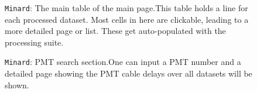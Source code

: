 \documentclass[12pt]{article}
\begin{document}
\clearpage

\begin{figure}
\centering
\noindent{}
  \caption{\centering \texttt{Minard}: The main table of the main page.\hspace{\textwidth}This table holds a line for each processed dataset. Most cells in here are clickable, leading to a more detailed page or list. These get auto-populated with the processing suite.}
  \label{fig:min2}
\end{figure}

\begin{figure}
\centering
\noindent{}
  \caption{\centering \texttt{Minard}: PMT search section.\hspace{\textwidth}One can input a PMT number and a detailed page showing the PMT cable delays over all datasets will be shown.}
  \label{fig:min3}
\end{figure}
\end{document}
